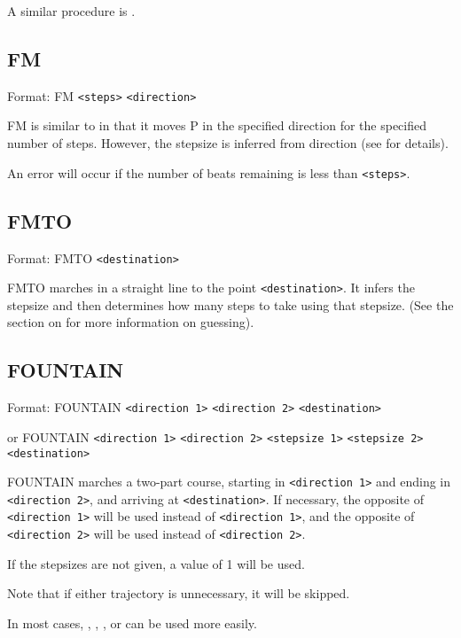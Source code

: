 A similar procedure is .

\subsection{FM}\label{fm}

Format: FM \verb$<steps>$ \verb$<direction>$

FM is similar to  in that it moves P in the
specified direction for the specified number of steps.  However, the
stepsize is inferred from direction (see 
for details).

An error will occur if the number of beats remaining is less than
\verb$<steps>$.

\subsection{FMTO}\label{fmto}

Format: FMTO \verb$<destination>$

FMTO marches in a straight line to the point \verb$<destination>$.  It
infers the stepsize and then determines how many steps to take using
that stepsize.  (See the section on  for
more information on guessing).

\subsection{FOUNTAIN}\label{fountain}

Format: FOUNTAIN \verb$<direction 1>$ \verb$<direction 2>$ \verb$<destination>$

or FOUNTAIN \verb$<direction 1>$ \verb$<direction 2>$ \verb$<stepsize 1>$ \verb$<stepsize 2>$ \verb$<destination>$

FOUNTAIN marches a two-part course, starting in \verb$<direction 1>$ and
ending in \verb$<direction 2>$, and arriving at \verb$<destination>$.
If necessary, the opposite of \verb$<direction 1>$ will be used instead
of \verb$<direction 1>$, and the opposite of \verb$<direction 2>$ will
be used instead of \verb$<direction 2>$.

If the stepsizes are not given, a value of 1 will be used.

Note that if either trajectory is unnecessary, it will be skipped.

In most cases, , ,
, or  can be used more easily.

